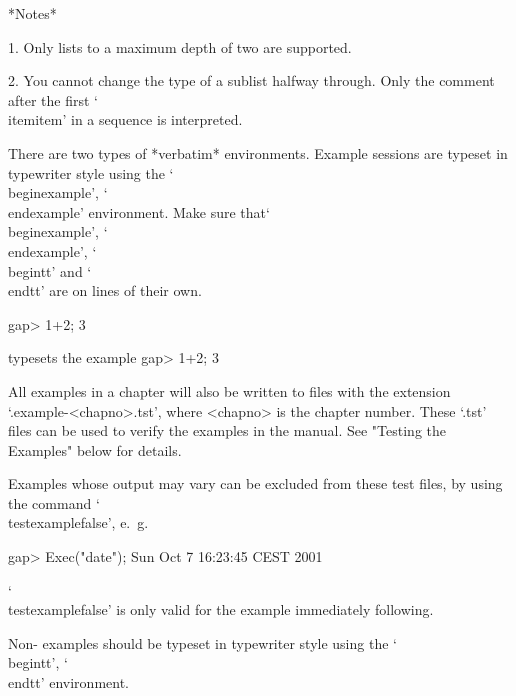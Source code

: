 *Notes*

\beginlist%
\item{1.} Only lists to a maximum depth of two are supported.

\item{2.} You cannot change the type of a sublist halfway through. Only
the comment after the first `\\itemitem' in a sequence is interpreted.

\endlist

\indextt{\\begintt}\indextt{\\endtt}
\indextt{\\beginexample}\indextt{\\endexample}
There are two types of *verbatim* environments.
Example {\GAP} sessions are typeset in typewriter style
using the `\\beginexample', `\\endexample' environment.
Make sure that`\\beginexample', `\\endexample',  `\\begintt' 
and `\\endtt' are on lines of their own.

\begintt
\beginexample
gap> 1+2;
3
\endexample
\endtt

typesets the example
\beginexample
gap> 1+2;
3
\endexample

All examples in a chapter will also be written to files with the extension 
`.example-<chapno>.tst', where <chapno> is the chapter number. These `.tst'
files can be used to verify the examples in the manual. See 
"Testing the Examples" below for details.

Examples whose output may vary can be excluded from these test files, by
using the command `\\testexamplefalse', e.~g.

\begintt
\testexamplefalse
\beginexample
gap> Exec("date");
Sun Oct  7 16:23:45 CEST 2001
\endexample
\endtt

`\\testexamplefalse' is only valid for the example immediately following.

Non-{\GAP} examples should be typeset in typewriter style
using the `\\begintt', `\\endtt' environment.

